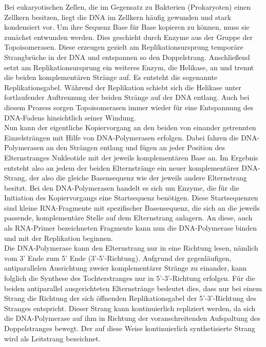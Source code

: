 Bei eukaryotischen Zellen, die im Gegensatz zu Bakterien (Prokaryoten) einen Zellkern besitzen, liegt die DNA im Zellkern häufig gewunden und stark kondensiert vor. Um ihre Sequenz Base für Base kopieren zu können, muss sie zunächst entwunden werden. Dies geschieht durch Enzyme aus der Gruppe der Topoisomerasen. Diese erzeugen gezielt am Replikationsursprung temporäre Strangbrüche in der DNA und entspannen so den Doppelstrang. Anschließend setzt am Replikationsursprung ein weiteres Enzym, die Helikase, an und trennt die beiden komplementären Stränge auf. Es entsteht die sogenannte Replikationsgabel. Während der Replikation schiebt sich die Helikase unter fortlaufender Auftrennung der beiden Stränge auf der DNA entlang. Auch bei diesem Prozess sorgen Topoisomerasen immer wieder für eine Entspannung des DNA-Fadens hinsichtlich seiner Windung. \\

Nun kann der eigentliche Kopiervorgang an den beiden von einander getrennten Einzelsträngen mit Hilfe von DNA-Polymerasen erfolgen. Dabei fahren die DNA-Polymerasen an den Strängen entlang und fügen an jeder Position des Elternstranges Nukleotide mit der jeweils komplementären Base an. Im Ergebnis entsteht also an jedem der beiden Elternstränge ein neuer komplementärer DNA-Strang, der also die gleiche Basensequenz wie der jeweils andere Elternstrang besitzt. Bei den DNA-Polymerasen handelt es sich um Enzyme, die für die Initiation des Kopiervorgangs eine Startsequenz benötigen. Diese Startsequenzen sind kleine RNA-Fragmente mit spezifischer Basensequenz, die sich an die jeweils passende, komplementäre Stelle auf dem Elternstrang anlagern. An diese, auch als RNA-Primer bezeichneten Fragmente kann nun die DNA-Polymerase binden und mit der Replikation beginnen. \\

Die DNA-Polymerase kann den Elternstrang nur in eine Richtung lesen, nämlich vom 3' Ende zum 5' Ende (3'-5'-Richtung). Aufgrund der gegenläufigen, antiparallelen Ausrichtung zweier komplementärer Stränge zu einander, kann folglich die Synthese des Tochterstranges nur in 5'-3'-Richtung erfolgen. Für die beiden antiparallel ausgerichteten Elternstränge bedeutet dies, dass nur bei einem Strang die Richtung der sich öffnenden Replikationsgabel der 5'-3'-Richtung des Stranges entspricht. Dieser Strang kann kontinuierlich repliziert werden, da sich die DNA-Polymerase auf ihm in Richtung der voranschreitenden Aufspaltung des Doppelstranges bewegt. Der auf diese Weise kontinuierlich synthetisierte Strang wird als Leitstrang bezeichnet. 

